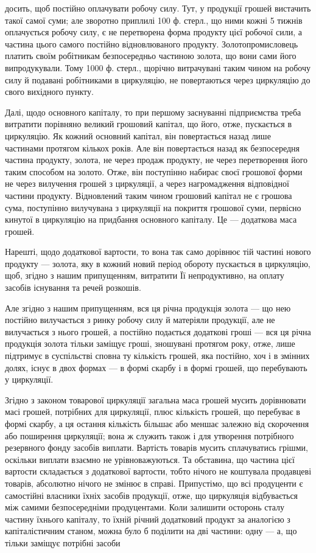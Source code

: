 \parcont{}  %
досить, щоб постійно оплачувати робочу силу. Тут, у продукції грошей
вистачить такої самої суми; але зворотно приплилі 100 ф. стерл., що ними
кожні 5 тижнів оплачується робочу силу, є не перетворена форма продукту
цієї робочої сили, а частина цього самого постійно відновлюваного
продукту. Золотопромисловець платить своїм робітникам безпосередньо
частиною золота, що вони сами його випродукували. Тому 1000 ф. стерл.,
щорічно витрачувані таким чином на робочу силу й подавані робітниками
в циркуляцію, не повертаються через циркуляцію до свого вихідного
пункту.

Далі, щодо основного капіталу, то при першому заснуванні підприємства
треба витратити порівняно великий грошовий капітал, що його,
отже, пускається в циркуляцію. Як кожний основний капітал, він повертається
назад лише частинами протягом кількох років. Але він повертається
назад як безпосередня частина продукту, золота, не через продаж
продукту, не через перетворення його таким способом на золото. Отже,
він поступінно набирає своєї грошової форми не через вилучення грошей
з циркуляції, а через нагромадження відповідної частини продукту.
Відновлений таким чином грошовий капітал не є грошова сума, поступінно
вилучувана з циркуляції на покриття грошової суми, первісно кинутої
в циркуляцію на придбання основного капіталу. Це — додаткова
маса грошей.

Нарешті, щодо додаткової вартости, то вона так само дорівнює тій
частині нового продукту — золота, яку в кожний новий період обороту
пускається в циркуляцію, щоб, згідно з нашим припущенням, витратити
Її непродуктивно, на оплату засобів існування та речей розкошів.

Але згідно з нашим припущенням, вся ця річна продукція золота —
що нею постійно вилучається з ринку робочу силу й матеріяли продукції,
але не вилучається з нього грошей, а постійно подається додаткові гроші
— вся ця річна продукція золота тільки заміщує гроші, зношувані протягом
року, отже, лише підтримує в суспільстві сповна ту кількість грошей,
яка постійно, хоч і в змінних долях, існує в двох формах — в формі
скарбу і в формі грошей, що перебувають у циркуляції.

Згідно з законом товарової циркуляції загальна маса грошей мусить
дорівнювати масі грошей, потрібних для циркуляції, плюс кількість грошей,
що перебуває в формі скарбу, а ця остання кількість більшає або
меншає залежно від скорочення або поширення циркуляції; вона ж служить
також і для утворення потрібного резервного фонду засобів виплати.
Вартість товарів мусить сплачуватись грішми, оскільки виплати
взаємно не урівноважуються. Та обставина, що частина цієї вартости
складається з додаткової вартости, тобто нічого не коштувала продавцеві
товарів, абсолютно нічого не змінює в справі. Припустімо, що всі
продуценти є самостійні власники їхніх засобів продукції, отже, що циркуляція
відбувається між самими безпосередніми продуцентами. Коли залишити
осторонь сталу частину їхнього капіталу, то їхній річний додатковий
продукт за аналогією з капіталістичним станом, можна було б поділити
на дві частини: одну — а, що тільки заміщує потрібні засоби
\parbreak{}  %
